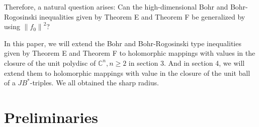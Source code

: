 \documentclass{birkjour}
\theoremstyle{plain}
\theoremstyle{definition}
\theoremstyle{definition}
\begin{document}
Therefore, a natural question arises: Can the high-dimensional Bohr and Bohr-Rogosinski inequalities given by Theorem E and Theorem F be generalized by using $\left \| f_0 \right \| ^ 2$?
\par
In this paper, we will extend the Bohr and Bohr-Rogosinski type inequalities given by Theorem E and Theorem F to holomorphic mappings with values in the closure of the unit polydisc of ${\mathbb{C}}^n, n \ge 2$ in section 3. And in section 4, we will extend them to holomorphic mappings with value in the closure of the unit ball of a \(JB^*\)-triples. We all obtained the sharp radius.


\section{Preliminaries}\label{Sec:2}
\end{document}
